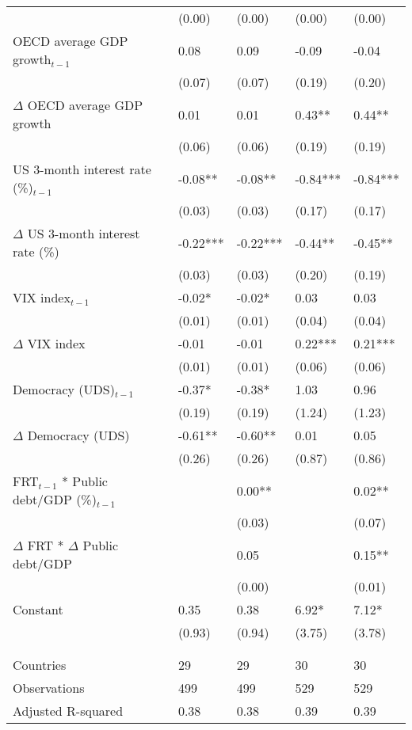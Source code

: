 \begin{tabular}{lp{3cm}p{3cm}p{3cm}p{3cm}}
   & (0.00) & (0.00) & (0.00) & (0.00) \\ 
  OECD average GDP growth$_{t-1}$ & 0.08 & 0.09 & -0.09 & -0.04 \\ 
   & (0.07) & (0.07) & (0.19) & (0.20) \\ 
  $\Delta$ OECD average GDP growth & 0.01 & 0.01 & 0.43** & 0.44** \\ 
   & (0.06) & (0.06) & (0.19) & (0.19) \\ 
  US 3-month interest rate (\%)$_{t-1}$ & -0.08** & -0.08** & -0.84*** & -0.84*** \\ 
   & (0.03) & (0.03) & (0.17) & (0.17) \\ 
  $\Delta$ US 3-month interest rate (\%) & -0.22*** & -0.22*** & -0.44** & -0.45** \\ 
   & (0.03) & (0.03) & (0.20) & (0.19) \\ 
  VIX index$_{t-1}$ & -0.02* & -0.02* & 0.03 & 0.03 \\ 
   & (0.01) & (0.01) & (0.04) & (0.04) \\ 
  $\Delta$ VIX index & -0.01 & -0.01 & 0.22*** & 0.21*** \\ 
   & (0.01) & (0.01) & (0.06) & (0.06) \\ 
  Democracy (UDS)$_{t-1}$ & -0.37* & -0.38* & 1.03 & 0.96 \\ 
   & (0.19) & (0.19) & (1.24) & (1.23) \\ 
  $\Delta$ Democracy (UDS) & -0.61** & -0.60** & 0.01 & 0.05 \\ 
   & (0.26) & (0.26) & (0.87) & (0.86) \\ 
  FRT$_{t-1}$ * Public debt/GDP (\%)$_{t-1}$ &  & 0.00** &  & 0.02** \\ 
   &  & (0.03) &  & (0.07) \\ 
  $\Delta$ FRT * $\Delta$ Public debt/GDP &  & 0.05 &  & 0.15** \\ 
   &  & (0.00) &  & (0.01) \\ 
  Constant & 0.35 & 0.38 & 6.92* & 7.12* \\ 
   & (0.93) & (0.94) & (3.75) & (3.78) \\ 
   &  &  &  &  \\ 
   &  &  &  &  \\ 
  Countries & 29 & 29 & 30 & 30 \\ 
  Observations & 499 & 499 & 529 & 529 \\ 
  Adjusted R-squared & 0.38 & 0.38 & 0.39 & 0.39 \\ 
   \hline
\end{tabular}
\endgroup
